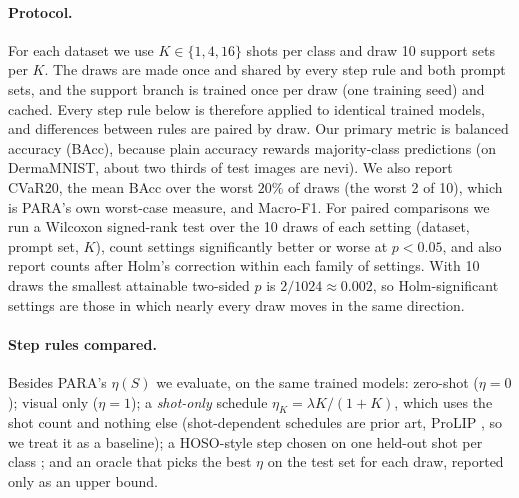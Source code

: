 \paragraph{Protocol.}
For each dataset we use $K \in \{1, 4, 16\}$ shots per class and draw 10 support sets per $K$.
The draws are made once and shared by every step rule and both prompt sets, and the support branch is trained once per draw
(one training seed) and cached.
Every step rule below is therefore applied to identical trained models, and differences between rules are paired by draw.
Our primary metric is balanced accuracy (BAcc), because plain accuracy rewards majority-class predictions
(on DermaMNIST, about two thirds of test images are nevi).
We also report CVaR20, the mean BAcc over the worst $20\%$ of draws (the worst 2 of 10), which is PARA's own worst-case measure,
and Macro-F1.
For paired comparisons we run a Wilcoxon signed-rank test over the 10 draws of each setting (dataset, prompt set, $K$),
count settings significantly better or worse at $p < 0.05$, and also report counts after Holm's correction within each family of settings.
With 10 draws the smallest attainable two-sided $p$ is $2/1024 \approx 0.002$, so Holm-significant settings are those
in which nearly every draw moves in the same direction.

\paragraph{Step rules compared.}
Besides PARA's $\eta(S)$ we evaluate, on the same trained models:
zero-shot ($\eta = 0$); visual only ($\eta = 1$);
a \emph{shot-only} schedule $\eta_K = \lambda K / (1 + K)$, which uses the shot count and nothing else
(shot-dependent schedules are prior art, \eg ProLIP \citep{fahes2026prolip}, so we treat it as a baseline);
a HOSO-style step chosen on one held-out shot per class \citep{vorster2026hoso};
and an oracle that picks the best $\eta$ on the test set for each draw, reported only as an upper bound.

